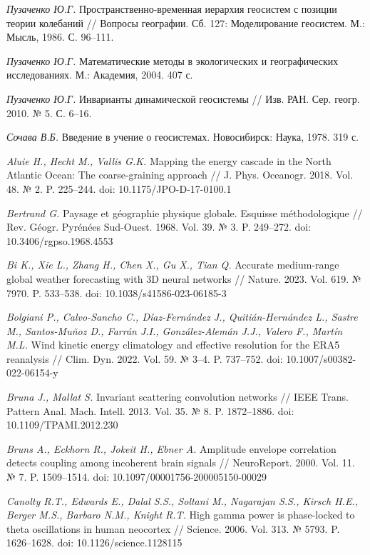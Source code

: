 \documentclass[12pt,a4paper]{article}
\begin{document}
\noindent \textit{Пузаченко Ю.Г.} Пространственно-временная иерархия геосистем с позиции теории колебаний // Вопросы географии. Сб. 127: Моделирование геосистем. М.: Мысль, 1986. С. 96–111.

\noindent \textit{Пузаченко Ю.Г.} Математические методы в экологических и географических исследованиях. М.: Академия, 2004. 407 с.

\noindent \textit{Пузаченко Ю.Г.} Инварианты динамической геосистемы // Изв. РАН. Сер. геогр. 2010. № 5. С. 6–16.

\noindent \textit{Сочава В.Б.} Введение в учение о геосистемах. Новосибирск: Наука, 1978. 319 с.

\noindent \textit{Aluie H., Hecht M., Vallis G.K.} Mapping the energy cascade in the North Atlantic Ocean: The coarse-graining approach // J. Phys. Oceanogr. 2018. Vol. 48. № 2. P. 225–244. doi: 10.1175/JPO-D-17-0100.1

\noindent \textit{Bertrand G.} Paysage et géographie physique globale. Esquisse méthodologique // Rev. Géogr. Pyrénées Sud-Ouest. 1968. Vol. 39. № 3. P. 249–272. doi: 10.3406/rgpso.1968.4553

\noindent \textit{Bi K., Xie L., Zhang H., Chen X., Gu X., Tian Q.} Accurate medium-range global weather forecasting with 3D neural networks // Nature. 2023. Vol. 619. № 7970. P. 533–538. doi: 10.1038/s41586-023-06185-3

\noindent \textit{Bolgiani P., Calvo-Sancho C., Díaz-Fernández J., Quitián-Hernández L., Sastre M., Santos-Muñoz D., Farrán J.I., González-Alemán J.J., Valero F., Martín M.L.} Wind kinetic energy climatology and effective resolution for the ERA5 reanalysis // Clim. Dyn. 2022. Vol. 59. № 3–4. P. 737–752. doi: 10.1007/s00382-022-06154-y

\noindent \textit{Bruna J., Mallat S.} Invariant scattering convolution networks // IEEE Trans. Pattern Anal. Mach. Intell. 2013. Vol. 35. № 8. P. 1872–1886. doi: 10.1109/TPAMI.2012.230

\noindent \textit{Bruns A., Eckhorn R., Jokeit H., Ebner A.} Amplitude envelope correlation detects coupling among incoherent brain signals // NeuroReport. 2000. Vol. 11. № 7. P. 1509–1514. doi: 10.1097/00001756-200005150-00029

\noindent \textit{Canolty R.T., Edwards E., Dalal S.S., Soltani M., Nagarajan S.S., Kirsch H.E., Berger M.S., Barbaro N.M., Knight R.T.} High gamma power is phase-locked to theta oscillations in human neocortex // Science. 2006. Vol. 313. № 5793. P. 1626–1628. doi: 10.1126/science.1128115
\end{document}
